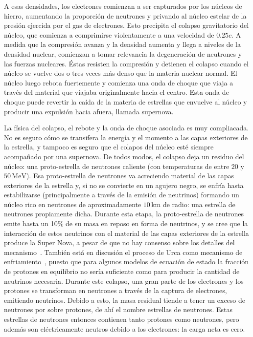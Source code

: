 A esas densidades, los electrones comienzan a ser capturados por los núcleos de hierro, aumentando la proporción de neutrones y privando al núcleo estelar de la presión ejercida por el gas de electrones.
Esto precipita el colapso gravitatorio del núcleo, que comienza a comprimirse violentamente a una velocidad de $0.25c$.
A medida que la compresión avanza y la densidad aumenta y llega a niveles de la densidad nuclear, comienzan a tomar relevancia la degeneración de neutrones y las fuerzas nucleares.
Éstas resisten la compresión y detienen el colapso cuando el núcleo se vuelve dos o tres veces más denso que la materia nuclear normal.
El núcleo luego rebota fuertemente y comienza una onda de choque que viaja a través del material que viajaba originalmente hacia el centro.
Esta onda de choque puede revertir la caída de la materia de estrellas que envuelve al núcleo y producir una expulsión hacia afuera, llamada supernova.

La física del colapso, el rebote y la onda de choque asociada es muy compliacada.
No es seguro cómo se transifera la energía y el momento a las capas exteriores de la estrella, y tampoco es seguro que el colapos del núcleo esté siempre acompañado por una supernova.
De todos modos, el colapso deja un residuo del núcleo: una proto-estrella de neutrones caliente (con temperaturas de entre $20$ y $50\,\text{MeV}$).
Esa proto-estrella de neutrones va acreciendo material de las capas exteriores de la estrella y, si no se convierte en un agujero negro, se enfría hasta estabilizarse (principalmente a través de la emisión de neutrinos) formando un núcleo rico en neutrones de aproximadamente $10\,\text{km}$ de radio: una estrella de neutrones propiamente dicha.
Durante esta etapa, la proto-estrella de neutrones emite hasta un 10\% de su masa en reposo en forma de neutrinos, y se cree que la interacción de estos neutrinos con el material de las capas exteriores de la estrella produce la Super Nova, a pesar de que no hay consenso sobre los detalles del mecanismo~\cite{woosley_physics_2005, bethe_supernova_1990}.
También está en discusión el proceso de Urca como mecanismo de enfriamiento~\cite{piekarewicz_proton_2012, lattimer_direct_1991}, puesto que para algunos modelos de ecuación de estado la fracción de protones en equilibrio no sería suficiente como para producir la cantidad de neutrinos necesaria.
Durante este colapso, una gran parte de los electrones y los protones se transforman en neutrones a través de la captura de electrones, emitiendo neutrinos.
Debido a esto, la masa residual tiende a tener un exceso de neutrones por sobre protones, de ahí el nombre estrellas de neutrones.
Estas estrellas de neutrones entonces contienen tanto protones como neutrones, pero además son eléctricamente neutros debido a los electrones: la carga neta es cero.

